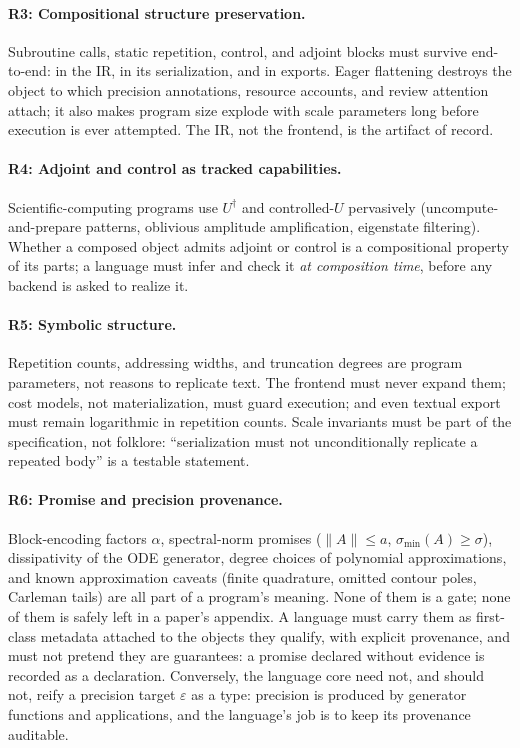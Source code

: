\paragraph{R3: Compositional structure preservation.}
Subroutine calls, static repetition, control, and adjoint blocks must survive
end-to-end: in the IR, in its serialization, and in exports.  Eager flattening
destroys the object to which precision annotations, resource accounts, and
review attention attach; it also makes program size explode with scale
parameters long before execution is ever attempted.  The IR, not the
frontend, is the artifact of record.

\paragraph{R4: Adjoint and control as tracked capabilities.}
Scientific-computing programs use $U^{\dagger}$ and controlled-$U$ pervasively
(uncompute-and-prepare patterns, oblivious amplitude amplification,
eigenstate filtering).  Whether a composed object admits adjoint or control
is a compositional property of its parts; a language must infer and check it
\emph{at composition time}, before any backend is asked to realize it.

\paragraph{R5: Symbolic structure.}
Repetition counts, addressing widths, and truncation degrees are program
parameters, not reasons to replicate text.  The frontend must never expand
them; cost models, not materialization, must guard execution; and even
textual export must remain logarithmic in repetition counts.  Scale
invariants must be part of the specification, not folklore:
``serialization must not unconditionally replicate a repeated body'' is a
testable statement.

\paragraph{R6: Promise and precision provenance.}
Block-encoding factors $\alpha$, spectral-norm promises
($\|A\|\le a$, $\sigma_{\min}(A)\ge\sigma$), dissipativity of
the ODE generator, degree choices of polynomial approximations, and known
approximation caveats (finite quadrature, omitted contour poles, Carleman
tails) are all part of a program's meaning.  None of them is a gate; none of
them is safely left in a paper's appendix.  A language must carry them as
first-class metadata attached to the objects they qualify, with explicit
provenance, and must not pretend they are guarantees: a promise declared
without evidence is recorded as a declaration.  Conversely, the language
core need not, and should not, reify a precision target $\varepsilon$ as a
type: precision is produced by generator functions and applications, and the
language's job is to keep its provenance auditable.

